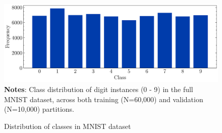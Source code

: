 \begin{figure}
    \caption{Distribution of classes in MNIST dataset}
	\label{fig:class-distributions}
	\includegraphics[width=1.0\textwidth]{graphics/class_distribution.pdf}
    \textbf{Notes}: Class distribution of digit instances (0 - 9) in the full MNIST dataset, across both training (N=60,000) and validation (N=10,000) partitions. 
\end{figure}
